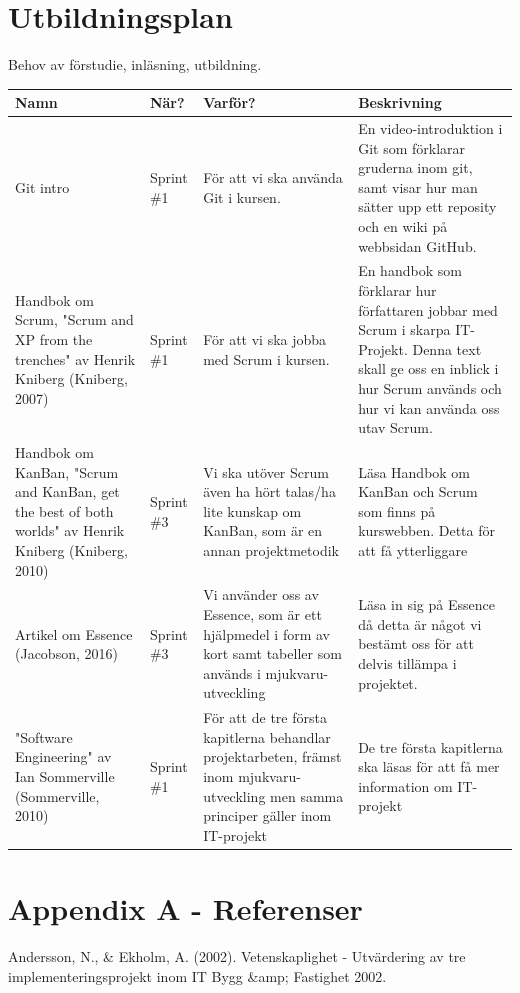 \documentclass[11pt]{article}
\begin{document}
\section{Utbildningsplan}
\label{sec:orge2e56c6}
Behov av förstudie, inläsning, utbildning.

\begin{center}
\begin{tabular}{p{3cm} p{3cm} p{3cm} p{7cm}}
Namn & När? & Varför? & Beskrivning\\
\hline
Git intro & Sprint \#1 & För att vi ska använda Git i kursen. & En video-introduktion i Git som förklarar gruderna inom git, samt visar hur man sätter upp ett reposity och en wiki på webbsidan GitHub.\\
Handbok om Scrum, "Scrum and XP from the trenches" av Henrik Kniberg (Kniberg, 2007) & Sprint \#1 & För att vi ska jobba med Scrum i kursen. & En handbok som förklarar hur författaren jobbar med Scrum i skarpa IT-Projekt. Denna text skall ge oss en inblick i hur Scrum används och hur vi kan använda oss utav Scrum.\\
Handbok om KanBan, "Scrum and KanBan, get the best of both worlds" av Henrik Kniberg (Kniberg, 2010) & Sprint \#3 & Vi ska utöver Scrum även ha hört talas/ha lite kunskap om KanBan, som är en annan projektmetodik & Läsa Handbok om KanBan och Scrum som finns på kurswebben. Detta för att få ytterliggare\\
Artikel om Essence (Jacobson, 2016) & Sprint \#3 & Vi använder oss av Essence, som är ett hjälpmedel i form av kort samt tabeller som används i mjukvaru-utveckling & Läsa in sig på Essence då detta är något vi bestämt oss för att delvis tillämpa i projektet.\\
"Software Engineering" av Ian Sommerville (Sommerville, 2010) & Sprint \#1 & För att de tre första kapitlerna behandlar projektarbeten, främst inom mjukvaru-utveckling men samma principer gäller inom IT-projekt & De tre första kapitlerna ska läsas för att få mer information om IT-projekt\\
\end{tabular}
\end{center}
\pagebreak
\section{Appendix A - Referenser}
\label{sec:orgee9b3b3}
Andersson, N., \& Ekholm, A. (2002). Vetenskaplighet - Utvärdering av tre
implementeringsprojekt inom IT Bygg \&amp; Fastighet 2002.
\end{document}
